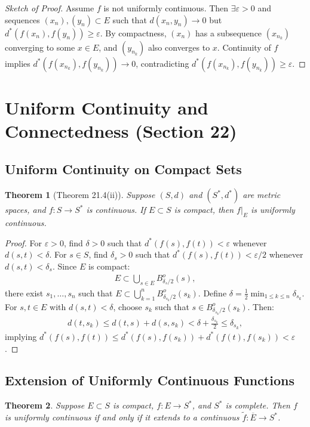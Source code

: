 \documentclass[9pt]{article}
\theoremstyle{definition}
\theoremstyle{plain}
\newtheorem{theorem}{Theorem}
\begin{document}
\begin{proof}[Sketch of Proof]
Assume $ f $ is not uniformly continuous. Then $ \exists \varepsilon > 0 $ and sequences $ (x_n), (y_n) \subset E $ such that $ d(x_n, y_n) \to 0 $ but $ d^*(f(x_n), f(y_n)) \geq \varepsilon $. By compactness, $ (x_n) $ has a subsequence $ (x_{n_k}) $ converging to some $ x \in E $, and $ (y_{n_k}) $ also converges to $ x $. Continuity of $ f $ implies $ d^*(f(x_{n_k}), f(y_{n_k})) \to 0 $, contradicting $ d^*(f(x_{n_k}), f(y_{n_k})) \geq \varepsilon $.
\end{proof}
\section*{Uniform Continuity and Connectedness (Section 22)}

\subsection*{Uniform Continuity on Compact Sets}
\begin{theorem}[Theorem 21.4(ii)]
Suppose $ (S, d) $ and $ (S^*, d^*) $ are metric spaces, and $ f : S \to S^* $ is continuous. If $ E \subset S $ is compact, then $ f|_E $ is uniformly continuous.
\end{theorem}

\begin{proof}
For $ \varepsilon > 0 $, find $ \delta > 0 $ such that $ d^*(f(s), f(t)) < \varepsilon $ whenever $ d(s, t) < \delta $. For $ s \in S $, find $ \delta_s > 0 $ such that $ d^*(f(s), f(t)) < \varepsilon/2 $ whenever $ d(s, t) < \delta_s $. Since $ E $ is compact:
\begin{align}
E \subset \bigcup_{s \in E} B_{\delta_s/2}^o(s),
\end{align}
there exist $ s_1, \ldots, s_n $ such that $ E \subset \bigcup_{k=1}^n B_{\delta_{s_k}/2}^o(s_k) $. Define $ \delta = \frac{1}{2} \min_{1 \leq k \leq n} \delta_{s_k} $. For $ s, t \in E $ with $ d(s, t) < \delta $, choose $ s_k $ such that $ s \in B_{\delta_{s_k}/2}^o(s_k) $. Then:
\begin{align}
d(t, s_k) \leq d(t, s) + d(s, s_k) < \delta + \frac{\delta_{s_k}}{2} \leq \delta_{s_k},
\end{align}
implying $ d^*(f(s), f(t)) \leq d^*(f(s), f(s_k)) + d^*(f(t), f(s_k)) < \varepsilon $.
\end{proof}

\subsection*{Extension of Uniformly Continuous Functions}
\begin{theorem}
Suppose $ E \subset S $ is compact, $ f : E \to S^* $, and $ S^* $ is complete. Then $ f $ is uniformly continuous if and only if it extends to a continuous $ \tilde{f} : \overline{E} \to S^* $.
\end{theorem}
\end{document}
